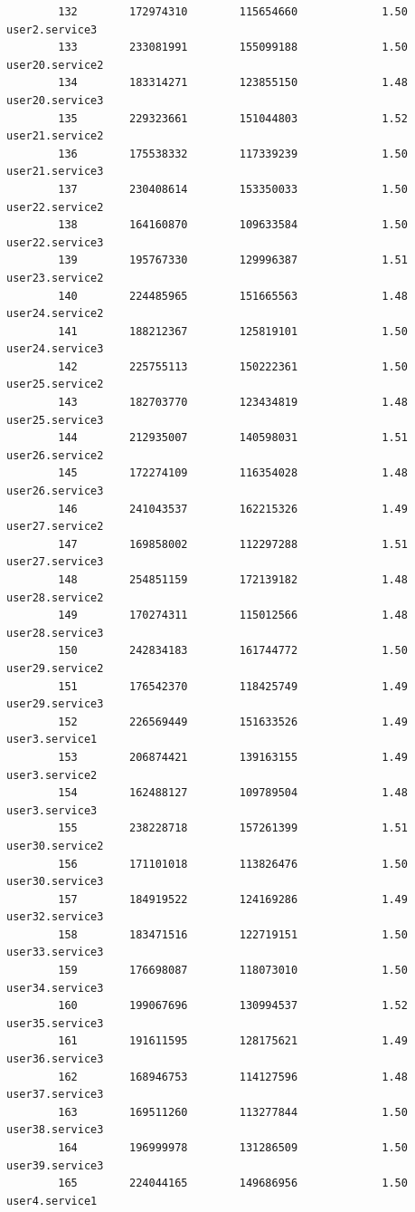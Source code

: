 \documentclass[a4paper]{report}
\begin{document}
\begin{lstlisting}
	    132        172974310        115654660             1.50  user2.service3
	    133        233081991        155099188             1.50  user20.service2
	    134        183314271        123855150             1.48  user20.service3
	    135        229323661        151044803             1.52  user21.service2
	    136        175538332        117339239             1.50  user21.service3
	    137        230408614        153350033             1.50  user22.service2
	    138        164160870        109633584             1.50  user22.service3
	    139        195767330        129996387             1.51  user23.service2
	    140        224485965        151665563             1.48  user24.service2
	    141        188212367        125819101             1.50  user24.service3
	    142        225755113        150222361             1.50  user25.service2
	    143        182703770        123434819             1.48  user25.service3
	    144        212935007        140598031             1.51  user26.service2
	    145        172274109        116354028             1.48  user26.service3
	    146        241043537        162215326             1.49  user27.service2
	    147        169858002        112297288             1.51  user27.service3
	    148        254851159        172139182             1.48  user28.service2
	    149        170274311        115012566             1.48  user28.service3
	    150        242834183        161744772             1.50  user29.service2
	    151        176542370        118425749             1.49  user29.service3
	    152        226569449        151633526             1.49  user3.service1
	    153        206874421        139163155             1.49  user3.service2
	    154        162488127        109789504             1.48  user3.service3
	    155        238228718        157261399             1.51  user30.service2
	    156        171101018        113826476             1.50  user30.service3
	    157        184919522        124169286             1.49  user32.service3
	    158        183471516        122719151             1.50  user33.service3
	    159        176698087        118073010             1.50  user34.service3
	    160        199067696        130994537             1.52  user35.service3
	    161        191611595        128175621             1.49  user36.service3
	    162        168946753        114127596             1.48  user37.service3
	    163        169511260        113277844             1.50  user38.service3
	    164        196999978        131286509             1.50  user39.service3
	    165        224044165        149686956             1.50  user4.service1

\end{lstlisting}
\end{document}
